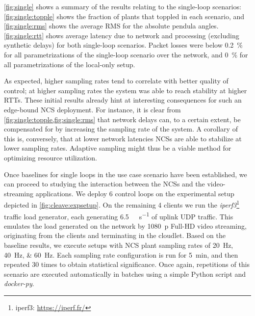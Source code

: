 \cref{fig:single} shows a summary of the results relating to the single-loop scenarios:
\cref{fig:single:topple} shows the fraction of plants that toppled in each scenario, and \cref{fig:single:rms} shows the average \ac{RMS} for the absolute pendula angles.
\cref{fig:single:rtt} shows average latency due to network and processing (excluding synthetic delays) for both single-loop scenarios.
Packet losses were below \SI{0.2}{\percent} for all parametrizations of the single-loop scenario over the network, and \SI{0}{\percent} for all parametrizations of the local-only setup.

As expected, higher sampling rates tend to correlate with better quality of control; at higher sampling rates the system was able to reach stability at higher \acp{RTT}.
These initial results already hint at interesting consequences for such an edge-bound \ac{NCS} deployment.
For instance, it is clear from \cref{fig:single:topple,fig:single:rms} that network delays can, to a certain extent, be compensated for by increasing the sampling rate of the system.
A corollary of this is, conversely, that at lower network latencies \acp{NCS} are able to stabilize at lower sampling rates.
Adaptive sampling might thus be a viable method for optimizing resource utilization.

Once baselines for single loops in the use case scenario have been established, we can proceed to studying the interaction between the \acp{NCS} and the video-streaming applications.
We deploy \num{6} control loops on the experimental setup depicted in \cref{fig:cleave:expsetup}.
On the remaining \num{4} clients we run the \emph{iperf3}\footnote{iperf3: \url{https://iperf.fr/}} traffic load generator, each generating \SI[per-mode=symbol]{6.5}{\mega\bit\per\second} of uplink \ac{UDP} traffic.
This emulates the load generated on the network by \SI{1080}{p} Full-HD video streaming, originating from the clients and terminating in the cloudlet.
Based on the baseline results, we execute setups with \ac{NCS} plant sampling rates of \SIlist{20;40;60}{\hertz}.
Each sampling rate configuration is run for \SI{5}{\minute}, and then repeated \num{30} times to obtain statistical significance.
Once again, repetitions of this scenario are executed automatically in batches using a simple Python script and \emph{docker-py}.

